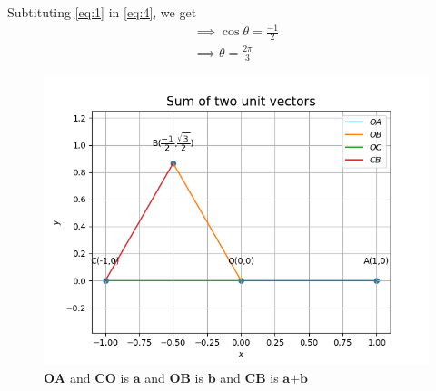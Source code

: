 \documentclass{article}
\renewcommand{\vec}[1]{\textbf{#1}}
\begin{document}
Subtituting \eqref{eq:1} in \eqref{eq:4}, we get
\begin{align}
	\implies \cos{\theta}=\frac{-1}{2}
	\\
	\implies \theta=\frac{2\pi}{3}
\end{align}
\begin{figure}[!h]
	\begin{center}
	\includegraphics[width=\columnwidth]{codes/Python/figs/fig.png}
	\end{center}
	\caption{$\vec{OA}$ and $\vec{CO}$ is $\vec{a}$ and $\vec{OB}$ is $\vec{b}$ and $\vec{CB}$ is $\vec{a+b}$}
	\label{fig:Fig1}
\end{figure}
\end{document}
